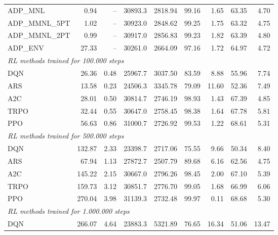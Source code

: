 \begin{samepage}
\begin{center}
\begin{tabular}{l|rr|rr|rr|rr}
    \midrule
    ADP\_MNL     &     0.94 &    -- &    30893.3 &    2818.94 &   99.16 &    1.65 &   63.35 &    4.70 \\
    ADP\_MMNL\_5PT &     1.02 &    -- &    30923.0 &    2848.62 &   99.25 &    1.75 &   63.32 &    4.75 \\
    ADP\_MMNL\_2PT &     0.99 &    -- &    30917.0 &    2856.83 &   99.23 &    1.82 &   63.39 &    4.80 \\
    ADP\_ENV     &    27.33 &    -- &    30261.0 &    2664.09 &   97.16 &    1.72 &   64.97 &    4.72 \\
    \midrule
    \multicolumn{9}{l}{\textit{RL methods trained for 100.000 steps}} \\
    \midrule
    DQN          &    26.36 &     0.48 &    25967.7 &    3037.50 &   83.59 &    8.88 &   55.96 &    7.74 \\
    ARS          &    13.58 &     0.23 &    24506.3 &    3345.78 &   79.09 &   11.60 &   52.36 &    7.49 \\
    A2C          &    28.01 &     0.50 &    30814.7 &    2746.19 &   98.93 &    1.43 &   67.39 &    4.85 \\
    TRPO         &    32.44 &     0.55 &    30647.0 &    2758.45 &   98.38 &    1.64 &   67.78 &    5.81 \\
    PPO          &    56.63 &     0.86 &    31000.7 &    2726.92 &   99.53 &    1.22 &   68.61 &    5.31 \\
    \midrule
    \multicolumn{9}{l}{\textit{RL methods trained for 500.000 steps}} \\
    \midrule
    DQN          &   132.87 &     2.33 &    23398.7 &    2717.06 &   75.55 &    9.66 &   50.34 &    8.40 \\
    ARS          &    67.94 &     1.13 &    27872.7 &    2507.79 &   89.68 &    6.16 &   62.56 &    4.75 \\
    A2C          &   145.22 &     2.15 &    30667.0 &    2796.26 &   98.45 &    2.00 &   67.10 &    5.39 \\
    TRPO         &   159.73 &     3.12 &    30851.7 &    2776.70 &   99.05 &    1.68 &   66.99 &    6.06 \\
    PPO          &   270.04 &     3.98 &    31139.3 &    2732.48 &   99.97 &    0.11 &   68.68 &    5.30 \\
    \midrule
    \multicolumn{9}{l}{\textit{RL methods trained for 1.000.000 steps}} \\
    \midrule
    DQN          &   266.07 &     4.64 &    23883.3 &    5321.89 &   76.65 &   16.34 &   51.06 &   13.47 \\

\end{tabular}
\end{center}
\end{samepage}
